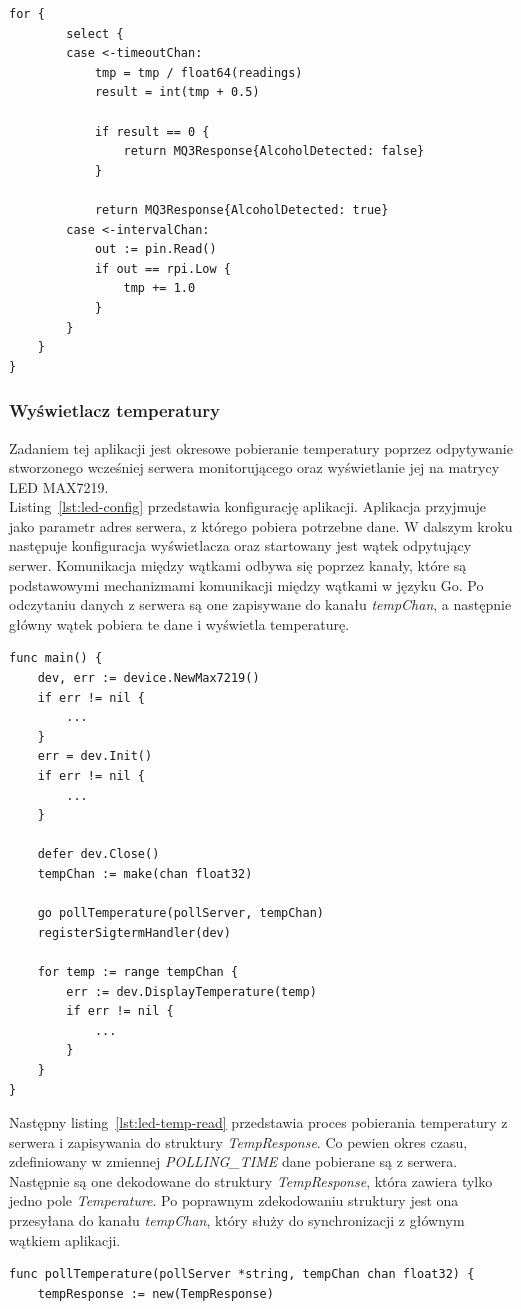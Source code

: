 \documentclass[12pt]{report}
\let\Oldsubsubsection\subsubsection
\renewcommand{\subsubsection}{\FloatBarrier\Oldsubsubsection}
\begin{document}
{\begin{lstlisting}[language=golang,caption=Pomiar alkoholu w powietrzu,label=lst:breathalyzer-run]
	for {
		select {
		case <-timeoutChan:
			tmp = tmp / float64(readings)
			result = int(tmp + 0.5)

			if result == 0 {
				return MQ3Response{AlcoholDetected: false}
			}

			return MQ3Response{AlcoholDetected: true}
		case <-intervalChan:
			out := pin.Read()
			if out == rpi.Low {
				tmp += 1.0
			}
		}
	}
}
\end{lstlisting}

\newpage
\subsubsection{Wyświetlacz temperatury}
Zadaniem tej aplikacji jest okresowe pobieranie temperatury poprzez odpytywanie stworzonego wcześniej serwera monitorującego oraz wyświetlanie jej na matrycy LED MAX7219. \\

\noindent Listing~\ref{lst:led-config} przedstawia konfigurację aplikacji. Aplikacja przyjmuje jako parametr adres serwera, z którego pobiera potrzebne dane. W dalszym kroku następuje konfiguracja wyświetlacza oraz startowany jest wątek odpytujący serwer. Komunikacja między wątkami odbywa się poprzez kanały, które są podstawowymi mechanizmami komunikacji między wątkami w języku Go. Po odczytaniu danych z serwera są one zapisywane do kanału \textit{tempChan}, a następnie główny wątek pobiera te dane i wyświetla temperaturę.
\begin{lstlisting}[language=golang,caption=Konfiguracja aplikacji,label=lst:led-config]
func main() {
	dev, err := device.NewMax7219()
	if err != nil {
		...
	}
	err = dev.Init()
	if err != nil {
		...
	}

	defer dev.Close()
	tempChan := make(chan float32)
	
	go pollTemperature(pollServer, tempChan)
	registerSigtermHandler(dev)
	
	for temp := range tempChan {
		err := dev.DisplayTemperature(temp)
		if err != nil {
			...
		}
	}
}
\end{lstlisting}

\newpage
\noindent Następny listing~\ref{lst:led-temp-read} przedstawia proces pobierania temperatury z serwera i zapisywania do struktury \textit{TempResponse}. Co pewien okres czasu, zdefiniowany w zmiennej \textit{POLLING\_TIME} dane pobierane są z serwera. Następnie są one dekodowane do struktury \textit{TempResponse}, która zawiera tylko jedno pole \textit{Temperature}. Po poprawnym zdekodowaniu struktury jest ona przesyłana do kanału \textit{tempChan}, który służy do synchronizacji z głównym wątkiem aplikacji.
\begin{lstlisting}[language=golang,caption=Odczyt temperatury z serwera,label=lst:led-temp-read]
func pollTemperature(pollServer *string, tempChan chan float32) {
	tempResponse := new(TempResponse)


\end{lstlisting}}
\end{document}
